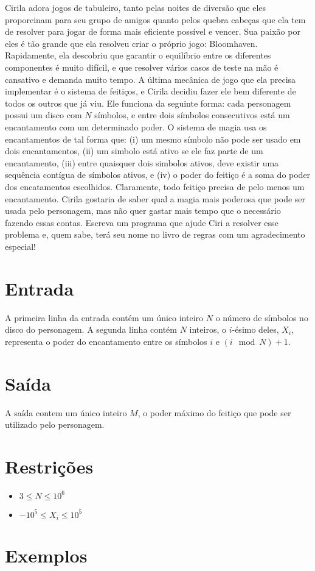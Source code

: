 Cirila adora jogos de tabuleiro, tanto pelas noites de diversão que eles proporcinam para seu grupo de amigos quanto pelos quebra cabeças que ela tem de resolver para jogar de forma mais eficiente possível e vencer.
Sua paixão por eles é tão grande que ela resolveu criar o próprio jogo: Bloomhaven. Rapidamente, ela descobriu que garantir o equilíbrio entre os diferentes componentes é muito difícil, e que resolver vários casos de teste na mão é cansativo e demanda muito tempo.
A última mecânica de jogo que ela precisa implementar é o sistema de feitiços, e Cirila decidiu fazer ele bem diferente de todos os outros que já viu.
Ele funciona da seguinte forma: cada personagem possui um disco com $N$ símbolos, e entre dois símbolos consecutivos está um encantamento com um determinado poder.
O sistema de magia usa os encantamentos de tal forma que: (i) um mesmo símbolo não pode ser usado em dois encantamentos, (ii) um simbolo está ativo se ele faz parte de um encantamento, (iii) entre quaisquer dois simbolos ativos, deve existir uma sequência contígua de símbolos ativos, e (iv) o poder do feitiço é a soma do poder dos encatamentos escolhidos.
Claramente, todo feitiço precisa de pelo menos um encantamento.
Cirila gostaria de saber qual a magia mais poderosa que pode ser usada pelo personagem, mas não quer gastar mais tempo que o necessário fazendo essas contas.
Escreva um programa que ajude Ciri a resolver esse problema e, quem sabe, terá seu nome no livro de regras com um agradecimento especial!

\section*{Entrada}

A primeira linha da entrada contém um único inteiro $N$ o número de símbolos no disco do personagem.
A segunda linha contém $N$ inteiros, o $i$-ésimo deles, $X_i$, representa o poder do encantamento entre os símbolos $i$ e $(i \mod N) + 1$.

\section*{Saída}

A saída contem um único inteiro $M$, o poder máximo do feitiço que pode ser utilizado pelo personagem.

\section*{Restrições}

\begin{itemize}
\item $3 \leq N \leq 10^6$
\item $-10^5 \leq X_i \leq 10^5$
\end{itemize}


\section*{Exemplos}

\exemplo

